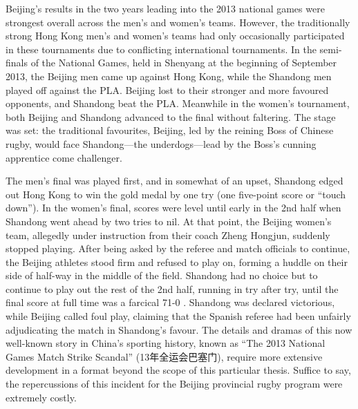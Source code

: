 \begin{CJK}{UTF8}{gbsn}
 Beijing's results in the two years leading into the 2013 national games were strongest overall across the men's and women's teams.   However, the traditionally strong Hong Kong men's and women's teams had only occasionally participated in these tournaments due to conflicting international tournaments.  In the semi-finals of the National Games, held in Shenyang at the beginning of September 2013, the Beijing men came up against Hong Kong, while the Shandong men played off against the PLA.  Beijing lost to their stronger and more favoured opponents, and Shandong beat the PLA.  Meanwhile in the women's tournament, both Beijing and Shandong advanced to the final without faltering.  The stage was set: the traditional favourites, Beijing, led by the reining Boss of Chinese rugby, would face Shandong---the underdogs---lead by the Boss's cunning apprentice come challenger.

 The men's final was played first, and in somewhat of an upset, Shandong edged out Hong Kong to win the gold medal by one try (one five-point score or ``touch down'').  In the women's final, scores were level until early in the 2nd half when Shandong went ahead by two tries to nil.  At that point, the Beijing women's team, allegedly under instruction from their coach Zheng Hongjun, suddenly stopped playing.  After being asked by the referee and match officials to continue, the Beijing athletes stood firm and refused to play on, forming a huddle on their side of half-way in the middle of the field. Shandong had no choice but to continue to play out the rest of the 2nd half, running in try after try, until the final score at full time was a farcical 71-0 \citep{Sina2013}.  Shandong was declared victorious, while Beijing called foul play, claiming that the Spanish referee had been unfairly adjudicating the match in Shandong's favour.  The details and dramas of this now well-known story in China's sporting history, known as ``The 2013 National Games Match Strike Scandal'' (13年全运会巴塞门), require more extensive development in a format beyond the scope of this particular thesis.  Suffice to say, the repercussions of this incident for the Beijing provincial rugby program were extremely costly.


\end{CJK}
